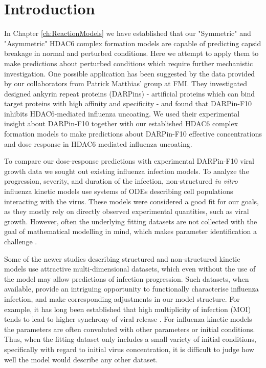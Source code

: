 \section{Introduction}


In Chapter \ref{ch:ReactionModels} we have established that our "Symmetric" and "Asymmetric" HDAC6 complex formation models are capable of predicting capsid breakage in normal and perturbed conditions. Here we attempt to apply them to make predictions about perturbed conditions which require further mechanistic investigation. One possible application has been suggested by the data provided by our collaborators from Patrick Matthias' group at FMI. They investigated designed ankyrin repeat proteins (DARPins) - artificial proteins which can bind target proteins with high affinity and specificity - and found that DARPin-F10 inhibits HDAC6-mediated influenza uncoating. We used their experimental insight about DARPin-F10 together with our established HDAC6 complex formation models to make predictions about DARPin-F10 effective concentrations and dose response in HDAC6 mediated influenza uncoating.

To compare our dose-response predictions with experimental DARPin-F10 viral growth data we sought out existing influenza infection models. To analyze the progression, severity, and duration of the infection, non-structured \textit{in vitro} influenza kinetic models use systems of ODEs describing cell populations interacting with the virus. These models were considered a good fit for our goals, as they mostly rely on directly observed experimental quantities, such as viral growth. However, often the underlying fitting datasets are not collected with the goal of mathematical modelling in mind, which makes parameter identification a challenge \cite{boianelli2015modeling}.

Some of the newer studies describing structured and non-structured kinetic models \cite{rudiger2019multiscale, schulze2009infection} use attractive multi-dimensional datasets, which even without the use of the model may allow predictions of infection progression. Such datasets, when available, provide an intriguing opportunity to functionally characterise influenza infection, and make corresponding adjustments in our model structure. For example, it has long been established that high multiplicity of infection (MOI) tends to lead to higher synchrony of viral release \cite{cairns1957asynchrony}. For influenza kinetic models the parameters are often convoluted with other parameters or initial conditions. Thus, when the fitting dataset only includes a small variety of initial conditions, specifically with regard to initial virus concentration, it is difficult to judge how well the model would describe any other dataset.

